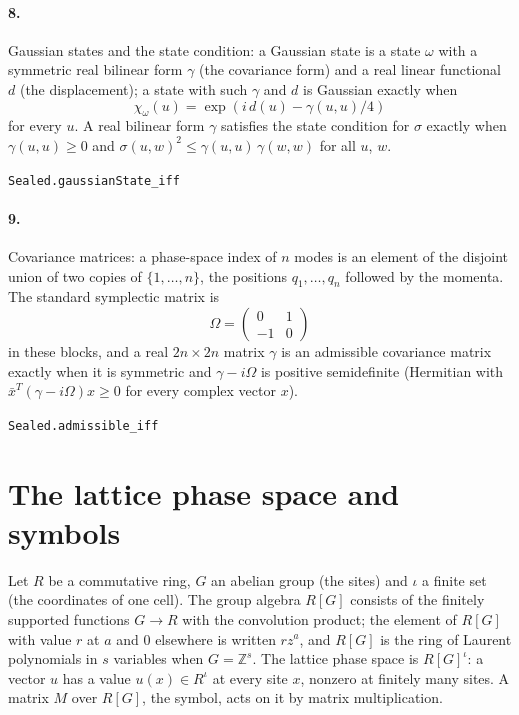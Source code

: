 \documentclass[11pt]{article}
\begin{document}
\paragraph{8.} Gaussian states and the state condition: a Gaussian state is a state $\omega$ with a symmetric real bilinear form $\gamma$ (the covariance form) and a real linear functional $d$ (the displacement); a state with such $\gamma$ and $d$ is Gaussian exactly when \[\chi_\omega(u) = \exp(i\, d(u) - \gamma(u, u)/4)\] for every $u$. A real bilinear form $\gamma$ satisfies the state condition for $\sigma$ exactly when $\gamma(u, u) \ge 0$ and $\sigma(u, w)^2 \le \gamma(u, u)\, \gamma(w, w)$ for all $u$, $w$.\par{\footnotesize\texttt{Sealed.gaussianState\_iff}}

\paragraph{9.} Covariance matrices: a phase-space index of $n$ modes is an element of the disjoint union of two copies of $\{1, \dots, n\}$, the positions $q_1, \dots, q_n$ followed by the momenta. The standard symplectic matrix is \[\Omega = \begin{pmatrix} 0 & 1 \\ -1 & 0 \end{pmatrix}\] in these blocks, and a real $2n \times 2n$ matrix $\gamma$ is an admissible covariance matrix exactly when it is symmetric and $\gamma - i\Omega$ is positive semidefinite (Hermitian with $\bar x^T (\gamma - i\Omega) x \ge 0$ for every complex vector $x$).\par{\footnotesize\texttt{Sealed.admissible\_iff}}

\section*{The lattice phase space and symbols}
Let $R$ be a commutative ring, $G$ an abelian group (the sites) and $\iota$ a finite set (the coordinates of one cell). The group algebra $R[G]$ consists of the finitely supported functions $G \to R$ with the convolution product; the element of $R[G]$ with value $r$ at $a$ and $0$ elsewhere is written $r z^a$, and $R[G]$ is the ring of Laurent polynomials in $s$ variables when $G = \mathbb Z^s$. The lattice phase space is $R[G]^\iota$: a vector $u$ has a value $u(x) \in R^\iota$ at every site $x$, nonzero at finitely many sites. A matrix $M$ over $R[G]$, the symbol, acts on it by matrix multiplication.
\end{document}
